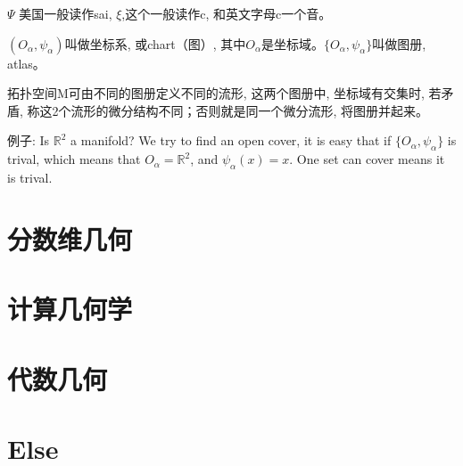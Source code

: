 \documentclass[UTF8]{../09-Mathematics}
\begin{document}
$\Psi$ 美国一般读作sai, $\xi$,这个一般读作c,  和英文字母c一个音。

$( O_\alpha, \psi_\alpha)$叫做坐标系, 或chart（图）, 其中$O_\alpha$是坐标域。$\{ O_\alpha, \psi_\alpha \}$叫做图册, atlas。

拓扑空间M可由不同的图册定义不同的流形, 这两个图册中, 坐标域有交集时, 若矛盾, 称这2个流形的微分结构不同；否则就是同一个微分流形, 将图册并起来。

例子: Is $\mathbb R^2$ a manifold? We try to find an open cover, it is easy that  if $\{ O_\alpha, \psi_\alpha \}$ is trival, which means that $O_\alpha = \mathbb R^2$, and $\psi_\alpha (x) = x $. One set can cover means it is trival.



\chapter{分数维几何}
\chapter{计算几何学}
\chapter{代数几何}



\chapter{Else}
\end{document}
